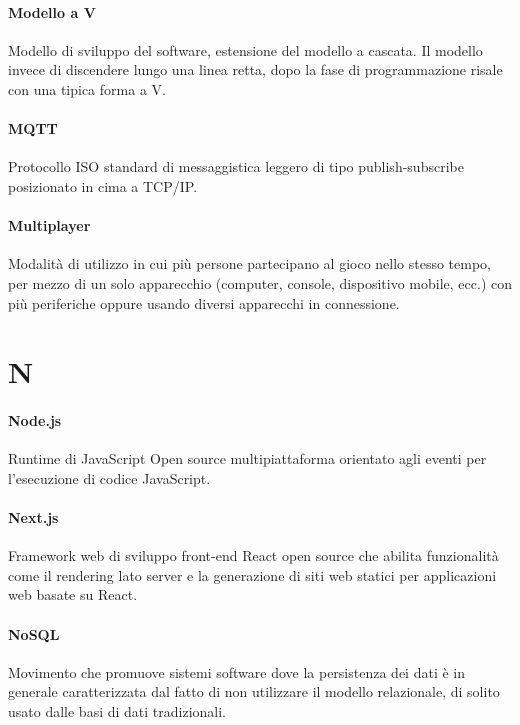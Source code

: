 \documentclass[]{article}
\begin{document}
	\paragraph*{Modello a V}
	Modello di sviluppo del software, estensione del modello a cascata. Il modello invece di discendere lungo una linea retta, dopo la fase di programmazione risale con una tipica forma a V.
	
	\paragraph*{MQTT}
	Protocollo ISO standard di messaggistica leggero di tipo publish-subscribe posizionato in cima a TCP/IP. 
	
	\paragraph*{Multiplayer}
	Modalità di utilizzo in cui più persone partecipano al gioco nello stesso tempo, per mezzo di un solo apparecchio (computer, console, dispositivo mobile, ecc.) con più periferiche oppure usando diversi apparecchi in connessione.
	
	\newpage
	
	\section*{N}
	
	\paragraph*{Node.js}
	Runtime di JavaScript Open source multipiattaforma orientato agli eventi per l'esecuzione di codice JavaScript.
	
	\paragraph*{Next.js}
	Framework web di sviluppo front-end React open source che abilita funzionalità come il rendering lato server e la generazione di siti web statici per applicazioni web basate su React.
	
	\paragraph*{NoSQL} 
	Movimento che promuove sistemi software dove la persistenza dei dati è in generale caratterizzata dal fatto di non utilizzare il modello relazionale, di solito usato dalle basi di dati tradizionali.
	
\end{document}
